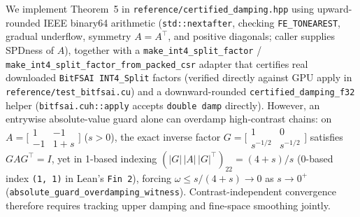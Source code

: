\documentclass[10pt]{article}
\begin{document}
We implement Theorem~5 in \texttt{reference/certified\_damping.hpp} using upward-rounded IEEE binary64 arithmetic (\texttt{std::nextafter}, checking \texttt{FE\_TONEAREST}, gradual underflow, symmetry $A = A^\top$, and positive diagonals; caller supplies SPDness of $A$), together with a \texttt{make\_int4\_split\_factor} / \texttt{make\_int4\_split\_factor\_from\_packed\_csr} adapter that certifies real downloaded \texttt{BitFSAI INT4\_Split} factors (verified directly against GPU apply in \texttt{reference/test\_bitfsai.cu}) and a downward-rounded \texttt{certified\_damping\_f32} helper (\texttt{bitfsai.cuh::apply} accepts \texttt{double damp} directly). However, an entrywise absolute-value guard alone can overdamp high-contrast chains: on $A = \bigl[\begin{smallmatrix}1 & -1\\ -1 & 1+s\end{smallmatrix}\bigr]$ ($s > 0$), the exact inverse factor $G = \bigl[\begin{smallmatrix}1 & 0\\ s^{-1/2} & s^{-1/2}\end{smallmatrix}\bigr]$ satisfies $G A G^\top = I$, yet in 1-based indexing $(|G|\,|A|\,|G|^\top)_{22} = (4+s)/s$ (0-based index \texttt{(1, 1)} in Lean's \texttt{Fin 2}), forcing $\omega \le s/(4+s) \to 0$ as $s \to 0^+$ (\texttt{absolute\_guard\_overdamping\_witness}). Contrast-independent convergence therefore requires tracking upper damping and fine-space smoothing jointly.
\end{document}
